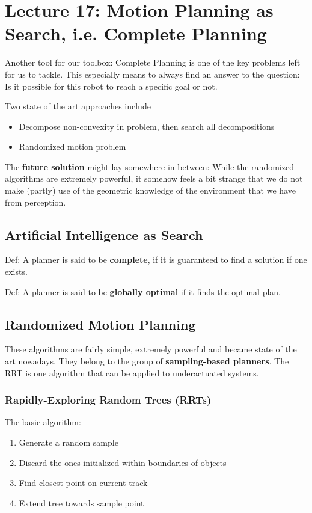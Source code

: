 \chapter{Lecture 17: Motion Planning as Search, i.e. Complete Planning}
Another tool for our toolbox: Complete Planning is one of the key problems left for us to tackle. This especially means to always find an answer to the question: Is it possible for this robot to reach a specific goal or not.

Two state of the art approaches include
\begin{itemize}
\item Decompose non-convexity in problem, then search all decompositions
\item Randomized motion problem
\end{itemize}  

The \textbf{future solution} might lay somewhere in between: While the randomized algorithms are extremely powerful, it somehow feels a bit strange that we do not make (partly) use of the geometric knowledge of the environment that we have from perception.


\section{Artificial Intelligence as Search}
Def: A planner is said to be \textbf{complete}, if it is guaranteed to find a solution if one exists.

Def: A planner is said to be \textbf{globally optimal} if it finds the optimal plan.

\section{Randomized Motion Planning}
These algorithms are fairly simple, extremely powerful and became state of the art nowadays. They belong to the group of \textbf{sampling-based planners}. The RRT is one algorithm that can be applied to underactuated systems. 
\subsection{Rapidly-Exploring Random Trees (RRTs)}
The basic algorithm: 
\begin{enumerate}
\item Generate a random sample
\item Discard the ones initialized within boundaries of objects
\item Find closest point on current track
\item Extend tree towards sample point
\end{enumerate}
